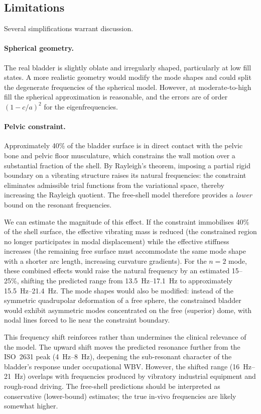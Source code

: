 \subsection{Limitations}
\label{sec:limitations}

Several simplifications warrant discussion.

\paragraph{Spherical geometry.}
The real bladder is slightly oblate and irregularly shaped, particularly at
low fill states.  A more realistic geometry would modify the mode shapes and
could split the degenerate frequencies of the spherical model.  However, at
moderate-to-high fill the spherical approximation is reasonable, and the
errors are of order $(1 - c/a)^2$ for the eigenfrequencies.

\paragraph{Pelvic constraint.}
Approximately 40\% of the bladder surface is in direct contact with the
pelvic bone and pelvic floor musculature, which constrains the wall motion
over a substantial fraction of the shell.  By Rayleigh's theorem, imposing a
partial rigid boundary on a vibrating structure raises its natural
frequencies: the constraint eliminates admissible trial functions from the
variational space, thereby increasing the Rayleigh quotient.  The free-shell
model therefore provides a \emph{lower} bound on the resonant frequencies.

We can estimate the magnitude of this effect.  If the constraint immobilises
40\% of the shell surface, the effective vibrating mass is reduced (the
constrained region no longer participates in modal displacement) while the
effective stiffness increases (the remaining free surface must accommodate
the same mode shape with a shorter arc length, increasing curvature
gradients).  For the $n = 2$ mode, these combined effects would raise the
natural frequency by an estimated 15--25\%, shifting the predicted range from
\SIrange{13.5}{17.1}{\hertz} to approximately \SIrange{15.5}{21.4}{\hertz}.  The mode
shapes would also be modified: instead of the symmetric quadrupolar
deformation of a free sphere, the constrained bladder would exhibit
asymmetric modes concentrated on the free (superior) dome, with nodal lines
forced to lie near the constraint boundary.

This frequency shift reinforces rather than undermines the clinical
relevance of the model.  The upward shift moves the predicted resonance
further from the ISO~2631 peak (\SIrange{4}{8}{\hertz}), deepening the
sub-resonant character of the bladder's response under occupational WBV.
However, the shifted range (\SIrange{16}{21}{\hertz}) overlaps with
frequencies produced by vibratory industrial equipment and rough-road
driving.  The free-shell predictions should be interpreted as conservative
(lower-bound) estimates; the true in-vivo frequencies are likely somewhat
higher.

